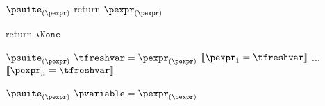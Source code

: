 \documentclass{article}
\begin{document}
\begin{mathpar}
\end{mathpar}

\newsavebox{\returnBox}
\begin{lrbox}{\returnBox}
\begin{python}
$\psuite_{(\pexpr)}$
return $\pexpr_{(\pexpr)}$
\end{python}
\end{lrbox}

\begin{mathpar}
\end{mathpar}

\newsavebox{\ereturnBox}
\begin{lrbox}{\ereturnBox}
\begin{python}
return $\mathtt{\star None}$
\end{python}
\end{lrbox}

\begin{mathpar}
\end{mathpar}

\newsavebox{\multipleAssignmentBox}
\begin{lrbox}{\multipleAssignmentBox}
\begin{python}
$\psuite_{(\pexpr)}$
$\tfreshvar = \pexpr_{(\pexpr)}$
$\meaningof{\pexpr_1 = \tfreshvar}$
...
$\meaningof{\pexpr_n = \tfreshvar}$
\end{python}
\end{lrbox}

\begin{mathpar}
\end{mathpar}

\newsavebox{\variableAssignmentBox}
\begin{lrbox}{\variableAssignmentBox}
\begin{python}
$\psuite_{(\pexpr)}$
$\pvariable = \pexpr_{(\pexpr)}$
\end{python}
\end{lrbox}
\end{document}
